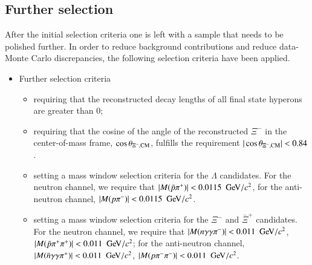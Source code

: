 \subsection{Further selection}
After the initial selection criteria one is left with a sample that needs to 
be polished further. In order to reduce background contributions and reduce
data-Monte Carlo discrepancies, the following selection criteria have been 
applied. 
\begin{itemize}
	\item Further selection criteria
		\begin{itemize}
			\item requiring that the reconstructed decay lengths
				of all final state hyperons are greater than
				0;
			\item requiring that the cosine of the angle of the 
				reconstructed $\Xi^-$ in the center-of-mass
				frame, $\cos\theta_{\Xi^-, {\rm CM}}$, 
				fulfills the requirement $|\cos\theta_{\Xi^-, {\rm CM}}| < 0.84$.
			\item setting a mass window selection criteria for the
				$\Lambda$ candidates. For the neutron channel,
				we require that $|M(\bar{p}\pi^+)| < 0.0115~\GeV/c^2$, 
				for the anti-neutron channel,
				$|M(p\pi^-)| < 0.0115~\GeV/c^2$.
			\item setting a mass window selection criteria for the 
				$\Xi^-$ and $\bar{\Xi}^+$ candidates. For the 
				neutron channel, we require that
				$|M(n\gamma\gamma\pi^-)| < 0.011~\GeV/c^2$,
				$|M(\bar{p}\pi^+\pi^+)| < 0.011~\GeV/c^2$;
				for the anti-neutron channel,
				$|M(\bar{n}\gamma\gamma\pi^+)| < 0.011~\GeV/c^2$,
				$|M(p\pi^-\pi^-)| < 0.011~\GeV/c^2$.
		\end{itemize}
\end{itemize}






